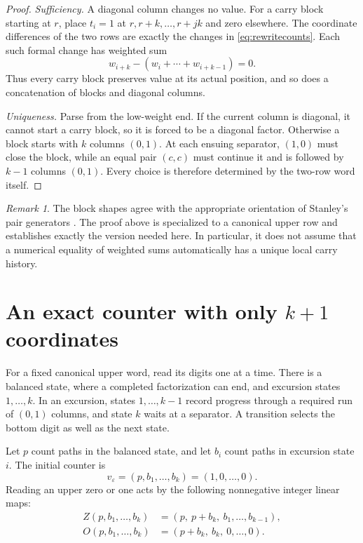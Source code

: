 \documentclass[11pt,letterpaper]{article}
\numberwithin{equation}{section}
\theoremstyle{definition}
\theoremstyle{remark}
\newtheorem{remark}[theorem]{Remark}
\newcommand{\eps}{\varepsilon}
\begin{document}
\begin{proof}
\emph{Sufficiency.} A diagonal column changes no value. For a carry block
starting at $r$, place $t_i=1$ at $r,r+k,\ldots,r+jk$ and zero elsewhere.
The coordinate differences of the two rows are exactly the changes in
\eqref{eq:rewritecounts}. Each such formal change has weighted sum
\[
 w_{i+k}-(w_i+\cdots+w_{i+k-1})=0.
\]
Thus every carry block preserves value at its actual position, and so
does a concatenation of blocks and diagonal columns.

\emph{Uniqueness.} Parse from the low-weight end. If the current column is
diagonal, it cannot start a carry block, so it is forced to be a diagonal
factor. Otherwise a block starts with $k$ columns $(0,1)$. At each ensuing
separator, $(1,0)$ must close the block, while an equal pair $(c,c)$ must
continue it and is followed by $k-1$ columns $(0,1)$. Every choice is
therefore determined by the two-row word itself.
\end{proof}

\begin{remark}
The block shapes agree with the appropriate orientation of Stanley's
pair generators \cite[Lemma 5.2]{Stanley}. The proof above is specialized
to a canonical upper row and establishes exactly the version needed here.
In particular, it does not assume that a numerical equality of weighted
sums automatically has a unique local carry history.
\end{remark}

\section{An exact counter with only \texorpdfstring{$k+1$}{k+1} coordinates}
\label{sec:counter}

For a fixed canonical upper word, read its digits one at a time. There is
a balanced state, where a completed factorization can end, and excursion
states $1,\ldots,k$. In an excursion, states $1,\ldots,k-1$ record progress
through a required run of $(0,1)$ columns, and state $k$ waits at a
separator. A transition selects the bottom digit as well as the next
state.

Let $p$ count paths in the balanced state, and let $b_i$ count paths in
excursion state $i$. The initial counter is
\begin{equation}
 v_\eps=(p,b_1,\ldots,b_k)=(1,0,\ldots,0).
 \label{eq:initial}
\end{equation}
Reading an upper zero or one acts by the following nonnegative integer
linear maps:
\begin{align}
 Z(p,b_1,\ldots,b_k)&=(p,\ p+b_k,\ b_1,\ldots,b_{k-1}),\label{eq:Z}\\
 O(p,b_1,\ldots,b_k)&=(p+b_k,\ b_k,\ 0,\ldots,0).\label{eq:O}
\end{align}
\end{document}
